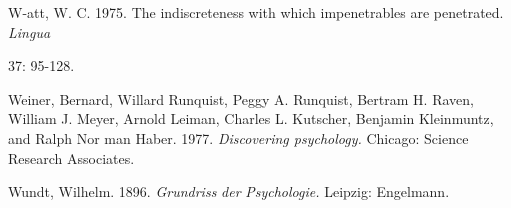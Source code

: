 \begin{styleStandard}
W{}-att, W. C. 1975. The indiscreteness with which impenetrables are penetrated. \textit{Lingua}
\end{styleStandard}


\begin{styleStandard}
37: 95-128.
\end{styleStandard}


\begin{styleStandard}
Weiner, Bernard, Willard Runquist, Peggy A. Runquist, Bertram H. Raven, William J. Meyer, Arnold Leiman, Charles L. Kutscher, Benjamin Kleinmuntz, and Ralph Nor\- man Haber. 1977. \textit{Discovering psychology.}\textit{ }Chicago: Science Research Associates.
\end{styleStandard}


\begin{styleStandard}
Wundt, Wilhelm. 1896. \textit{Grundriss}\textit{ }\textit{der}\textit{ }\textit{Psychologie.}\textit{ }Leipzig: Engelmann.
\end{styleStandard}
